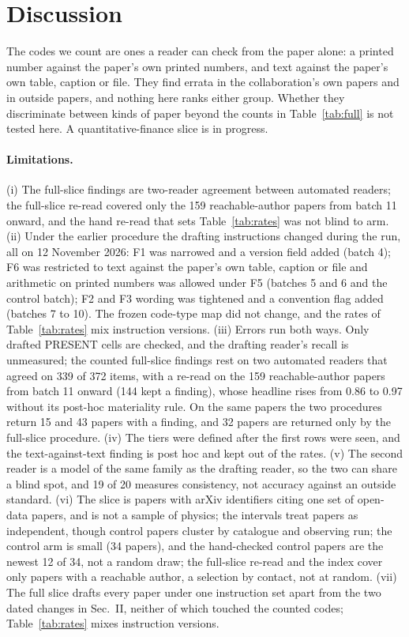 \documentclass[reprint,amsmath,amssymb,aps,superscriptaddress,nofootinbib]{revtex4-2}
\begin{document}
\section{Discussion}

The codes we count are ones a reader can check from the paper alone: a printed number against the paper's own printed numbers, and text against the paper's own table, caption or file. They find errata in the collaboration's own papers and in outside papers, and nothing here ranks either group. Whether they discriminate between kinds of paper beyond the counts in Table~\ref{tab:full} is not tested here. A quantitative-finance slice is in progress.

\paragraph*{Limitations.} (i) The full-slice findings are two-reader agreement between automated readers; the full-slice re-read covered only the 159 reachable-author papers from batch 11 onward, and the hand re-read that sets Table~\ref{tab:rates} was not blind to arm. (ii) Under the earlier procedure the drafting instructions changed during the run, all on 12 November 2026: F1 was narrowed and a version field added (batch 4); F6 was restricted to text against the paper's own table, caption or file and arithmetic on printed numbers was allowed under F5 (batches 5 and 6 and the control batch); F2 and F3 wording was tightened and a convention flag added (batches 7 to 10). The frozen code-type map did not change, and the rates of Table~\ref{tab:rates} mix instruction versions. (iii) Errors run both ways. Only drafted PRESENT cells are checked, and the drafting reader's recall is unmeasured; the counted full-slice findings rest on two automated readers that agreed on 339 of 372 items, with a re-read on the 159 reachable-author papers from batch 11 onward (144 kept a finding), whose headline rises from 0.86 to 0.97 without its post-hoc materiality rule. On the same papers the two procedures return 15 and 43 papers with a finding, and 32 papers are returned only by the full-slice procedure. (iv) The tiers were defined after the first rows were seen, and the text-against-text finding is post hoc and kept out of the rates. (v) The second reader is a model of the same family as the drafting reader, so the two can share a blind spot, and 19 of 20 measures consistency, not accuracy against an outside standard. (vi) The slice is papers with arXiv identifiers citing one set of open-data papers, and is not a sample of physics; the intervals treat papers as independent, though control papers cluster by catalogue and observing run; the control arm is small (34 papers), and the hand-checked control papers are the newest 12 of 34, not a random draw; the full-slice re-read and the index cover only papers with a reachable author, a selection by contact, not at random. (vii) The full slice drafts every paper under one instruction set apart from the two dated changes in Sec.~II, neither of which touched the counted codes; Table~\ref{tab:rates} mixes instruction versions.
\end{document}
